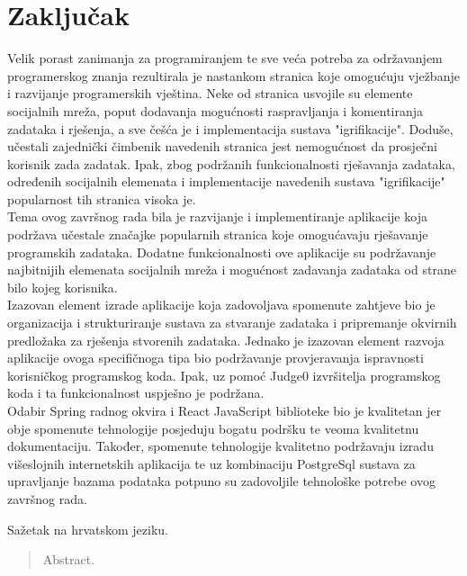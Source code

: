 \documentclass[times, utf8, zavrsni, numeric]{fer}
\begin{document}
	
	\chapter{Zaključak}
	Velik porast zanimanja za programiranjem te sve veća potreba za održavanjem programerskog znanja rezultirala je nastankom stranica koje omogućuju vježbanje i razvijanje programerskih vještina. Neke od stranica usvojile su elemente socijalnih mreža, poput dodavanja mogućnosti raspravljanja i komentiranja zadataka i rješenja, a sve češća je i implementacija sustava "igrifikacije". Doduše, učestali zajednički čimbenik navedenih stranica jest nemogućnost da prosječni korisnik zada zadatak. Ipak, zbog podržanih funkcionalnosti rješavanja zadataka, određenih socijalnih elemenata i implementacije navedenih sustava "igrifikacije" popularnost tih stranica visoka je.\\
	Tema ovog završnog rada bila je razvijanje i implementiranje aplikacije koja podržava učestale značajke popularnih stranica koje omogućavaju rješavanje programskih zadataka. Dodatne funkcionalnosti ove aplikacije su podržavanje najbitnijih elemenata socijalnih mreža i mogućnost zadavanja zadataka od strane bilo kojeg korisnika. \\
	Izazovan element izrade aplikacije koja zadovoljava spomenute zahtjeve bio je organizacija i strukturiranje sustava za stvaranje zadataka i pripremanje okvirnih predložaka za rješenja stvorenih zadataka. Jednako je izazovan element razvoja aplikacije ovoga specifičnoga tipa bio podržavanje provjeravanja ispravnosti korisničkog programskog koda. Ipak, uz pomoć Judge0 izvršitelja programskog koda i ta funkcionalnost uspješno je podržana.\\
	Odabir Spring radnog okvira i React JavaScript biblioteke bio je kvalitetan jer obje spomenute tehnologije posjeduju bogatu podršku te veoma kvalitetnu dokumentaciju. Također, spomenute tehnologije kvalitetno podržavaju izradu višeslojnih internetskih aplikacija te uz kombinaciju PostgreSql sustava za upravljanje bazama podataka potpuno su zadovoljile tehnološke potrebe ovog završnog rada.\\
	
	
	

	
	
	
	\begin{sazetak}
		Sažetak na hrvatskom jeziku.
		
	\end{sazetak}
	
	\begin{abstract}
		Abstract.
		
	\end{abstract}
	
\end{document}
